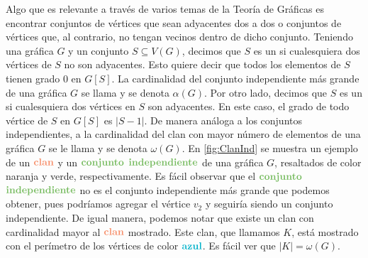     Algo que es relevante a trav\'es de varios temas de la Teor\'ia de
    Gr\'aficas es encontrar conjuntos de v\'ertices que sean adyacentes dos a
    dos o conjuntos de v\'ertices que, al contrario, no tengan vecinos dentro de
    dicho conjunto. Teniendo una gr\'afica $G$ y un conjunto $S \subseteq V(G)$,
    decimos que $S$ es un  si cualesquiera dos
    v\'ertices de $S$ no son adyacentes. Esto quiere decir que todos los
    elementos de $S$ tienen grado $0$ en $G[S]$. La cardinalidad del conjunto
    independiente m\'as grande de una gr\'afica $G$ se llama  y se denota $\alpha (G)$. Por otro lado, decimos que $S$ es
    un  si cualesquiera dos v\'ertices en $S$ son adyacentes. En
    este caso, el grado de todo v\'ertice de $S$ en $G[S]$ es $|S-1|$. De manera
    an\'aloga a los conjuntos independientes, a la cardinalidad del clan con
    mayor n\'umero de elementos de una gr\'afica $G$ se le llama
     y se denota $\omega(G)$. En \cref{fig:ClanInd} se
    muestra un ejemplo de un ${\color{coral}\bf {clan}}$ y un ${\color{verde}\bf
    {conjunto}}$ ${\color{verde}\bf {independiente}}$ de una gr\'afica $G$,
    resaltados de color naranja y verde, respectivamente. Es f\'acil observar
    que el ${\color{verde}\bf {conjunto}}$ ${\color{verde}\bf {independiente}}$
    no es el conjunto independiente m\'as grande que podemos obtener, pues
    podr\'iamos agregar el v\'ertice $v_2$ y seguir\'ia siendo un conjunto
    independiente. De igual manera, podemos notar que existe un clan con
    cardinalidad mayor al ${\color{coral}\bf {clan}}$ mostrado. Este clan, que
    llamamos $K$, est\'a mostrado con el per\'imetro de los v\'ertices de color
    ${\color{azulCielo}\bf {azul}}$. Es f\'acil ver que $|K| = \omega (G)$.


